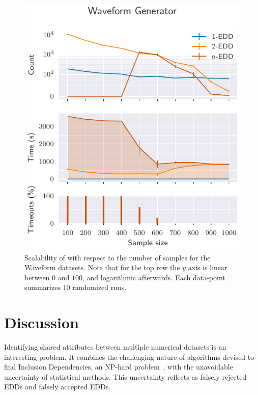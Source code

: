 \begin{figure}[htb]
    \centering
    \includegraphics{images/5_presq/scalability_sample_wave}
    \caption[Scalability of \PresQ with respect to the number of samples for the Waveform datasets.]{
        Scalability of \PresQ with respect to the number of samples for the Waveform datasets.
        Note that for the top row the $y$ axis is linear between $0$ and $100$, and
        logarithmic afterwards. Each data-point summarizes 10 randomized runs.
    }
    \label{fig:scalability_sample_size}
\end{figure}

\FloatBarrier

\section{Discussion}
\label{sec:discussion}

Identifying shared attributes between multiple numerical datasets is an interesting
problem. It combines the challenging nature of algorithms devised to find Inclusion Dependencies,
an NP-hard problem~\cite{kantola1992}, with the unavoidable uncertainty of statistical
methods.
This uncertainty reflects as falsely rejected \glspl{EDD} and falsely accepted \glspl{EDD}.

